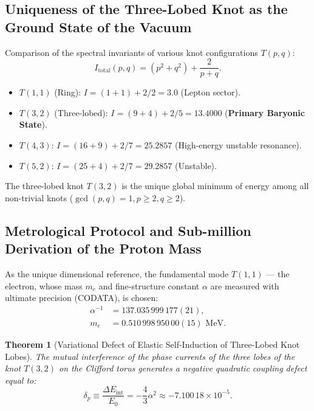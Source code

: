 \documentclass[12pt,a4paper]{article}
\newtheorem{theorem}{Theorem}
\begin{document}
	\subsection{Uniqueness of the Three-Lobed Knot as the Ground State of the Vacuum}
	Comparison of the spectral invariants of various knot configurations $T(p,q)$:
	\begin{equation}
	I_{\text{total}}(p,q) = (p^2 + q^2) + \frac{2}{p+q}.
	\end{equation}
	\begin{itemize}
	\item $T(1,1)$ (Ring): $I = (1+1) + 2/2 = 3.0$ (Lepton sector).
	\item $T(3,2)$ (Three-lobed): $I = (9+4) + 2/5 = \mathbf{13.4000}$ (\textbf{Primary Baryonic State}).
	\item $T(4,3)$: $I = (16+9) + 2/7 = 25.2857$ (High-energy unstable resonance).
	\item $T(5,2)$: $I = (25+4) + 2/7 = 29.2857$ (Unstable).
	\end{itemize}
	The three-lobed knot $T(3,2)$ is the unique global minimum of energy among all non-trivial knots ($\gcd(p,q)=1, p \ge 2, q \ge 2$).
		
	\subsection{Metrological Protocol and Sub-million Derivation of the Proton Mass}
	As the unique dimensional reference, the fundamental mode $T(1,1)$ --- the electron, whose mass $m_e$ and fine-structure constant $\alpha$ are measured with ultimate precision (CODATA), is chosen:
	\begin{align}
	\alpha^{-1} &= 137.035\,999\,177(21), \\
	m_e &= 0.510\,998\,950\,00(15) \text{ MeV}.
	\end{align}
		
	\begin{theorem}[Variational Defect of Elastic Self-Induction of Three-Lobed Knot Lobes]
	The mutual interference of the phase currents of the three lobes of the knot $T(3,2)$ on the Clifford torus generates a negative quadratic coupling defect equal to:
	\begin{equation}
	\delta_p \equiv \frac{\Delta E_{\mathrm{int}}}{E_0} = -\frac{4}{3} \alpha^2 \approx -7.100\,18 \times 10^{-5}.
	\end{equation}
	\end{theorem}
	
\end{document}
